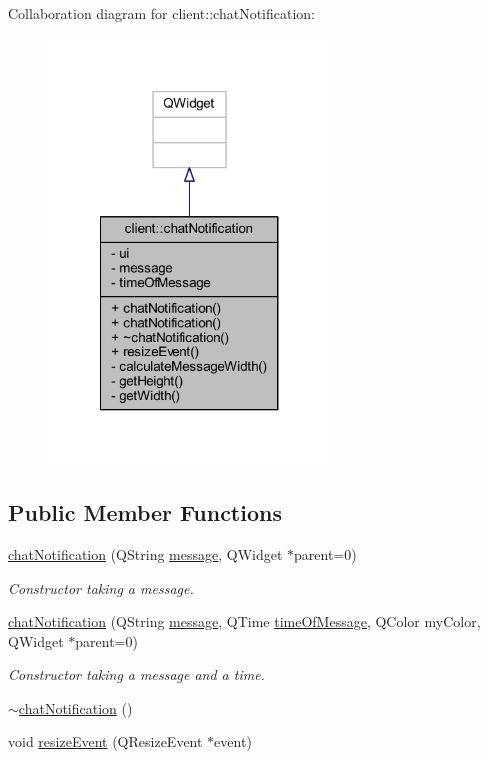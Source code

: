 Collaboration diagram for client\-:\-:chat\-Notification\-:\nopagebreak
\begin{figure}[H]
\begin{center}
\leavevmode
\includegraphics[width=212pt]{dc/dfd/classclient_1_1chat_notification__coll__graph}
\end{center}
\end{figure}
\subsection*{Public Member Functions}
\begin{DoxyCompactItemize}
\item 
\hyperlink{classclient_1_1chat_notification_ae2fcac96b85efe37fd12c38282120e18}{chat\-Notification} (Q\-String \hyperlink{classclient_1_1chat_notification_a0052e2119fe7620b3dc955ba6135c915}{message}, Q\-Widget $\ast$parent=0)
\begin{DoxyCompactList}\small\item\em Constructor taking a message. \end{DoxyCompactList}\item 
\hyperlink{classclient_1_1chat_notification_a684a7cdcf71cda53fcc61a0a94d5ed23}{chat\-Notification} (Q\-String \hyperlink{classclient_1_1chat_notification_a0052e2119fe7620b3dc955ba6135c915}{message}, Q\-Time \hyperlink{classclient_1_1chat_notification_ac2cf7f6030625593ba26f5f62ebd3482}{time\-Of\-Message}, Q\-Color my\-Color, Q\-Widget $\ast$parent=0)
\begin{DoxyCompactList}\small\item\em Constructor taking a message and a time. \end{DoxyCompactList}\item 
\hyperlink{classclient_1_1chat_notification_a8123fd954f4aede301f59474b8e3752d}{$\sim$chat\-Notification} ()
\item 
void \hyperlink{classclient_1_1chat_notification_ae6afe176382747d63b6e49b94741e82c}{resize\-Event} (Q\-Resize\-Event $\ast$event)
\end{DoxyCompactItemize}
